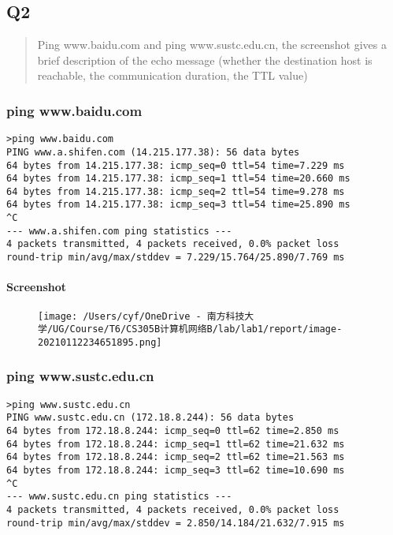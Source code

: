 \documentclass[
]{article}
\begin{document}
\hypertarget{header-n26}{%
\subsection{Q2}\label{header-n26}}

\begin{quote}
Ping www.baidu.com and ping www.sustc.edu.cn, the screenshot gives a
brief description of the echo message (whether the destination host is
reachable, the communication duration, the TTL value)
\end{quote}

\hypertarget{header-n29}{%
\subsubsection{ping www.baidu.com}\label{header-n29}}

\begin{verbatim}
>ping www.baidu.com
PING www.a.shifen.com (14.215.177.38): 56 data bytes
64 bytes from 14.215.177.38: icmp_seq=0 ttl=54 time=7.229 ms
64 bytes from 14.215.177.38: icmp_seq=1 ttl=54 time=20.660 ms
64 bytes from 14.215.177.38: icmp_seq=2 ttl=54 time=9.278 ms
64 bytes from 14.215.177.38: icmp_seq=3 ttl=54 time=25.890 ms
^C
--- www.a.shifen.com ping statistics ---
4 packets transmitted, 4 packets received, 0.0% packet loss
round-trip min/avg/max/stddev = 7.229/15.764/25.890/7.769 ms
\end{verbatim}

\hypertarget{header-n31}{%
\paragraph{Screenshot}\label{header-n31}}

\begin{figure}
\centering
\texttt{[image: /Users/cyf/OneDrive - 南方科技大学/UG/Course/T6/CS305B计算机网络B/lab/lab1/report/image-20210112234651895.png]}
\caption{}
\end{figure}

\hypertarget{header-n33}{%
\subsubsection{ping www.sustc.edu.cn}\label{header-n33}}

\begin{verbatim}
>ping www.sustc.edu.cn
PING www.sustc.edu.cn (172.18.8.244): 56 data bytes
64 bytes from 172.18.8.244: icmp_seq=0 ttl=62 time=2.850 ms
64 bytes from 172.18.8.244: icmp_seq=1 ttl=62 time=21.632 ms
64 bytes from 172.18.8.244: icmp_seq=2 ttl=62 time=21.563 ms
64 bytes from 172.18.8.244: icmp_seq=3 ttl=62 time=10.690 ms
^C
--- www.sustc.edu.cn ping statistics ---
4 packets transmitted, 4 packets received, 0.0% packet loss
round-trip min/avg/max/stddev = 2.850/14.184/21.632/7.915 ms
\end{verbatim}
\end{document}

